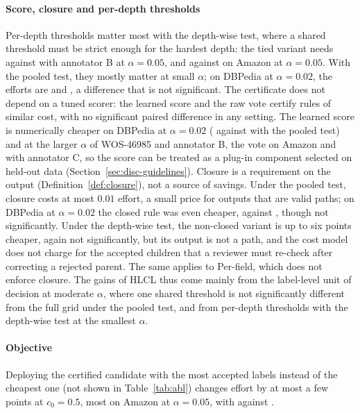 \documentclass[preprint,12pt]{elsarticle}
\theoremstyle{definition}
\newcommand{\hlcl}{\textup{\textsc{HLCL}}}
\begin{document}
\paragraph{Score, closure and per-depth thresholds}
Per-depth thresholds matter most with the depth-wise test, where a shared
threshold must be strict enough for the hardest depth: the tied variant needs
 against
 with annotator B at $\alpha=0.05$, and
 against
 on Amazon at $\alpha=0.05$. With the pooled
test, they mostly matter at small $\alpha$; on DBPedia at $\alpha=0.02$, the
efforts are  and
, a difference that is not significant.
The certificate does not depend on a tuned scorer: the learned score and the raw
vote certify rules of similar cost, with no significant paired difference in
any setting. The learned score is numerically cheaper on DBPedia at
$\alpha=0.02$ ( against
 with the pooled test) and at the
larger $\alpha$ of WOS-46985 and annotator B, the vote on Amazon and with
annotator C, so the score can be treated as a plug-in component selected on
held-out data (Section~\ref{sec:disc-guidelines}). Closure is a requirement on
the output (Definition~\ref{def:closure}), not a source of savings. Under the
pooled test, closure costs at most $0.01$ effort, a small price for outputs
that are valid paths; on DBPedia at $\alpha=0.02$ the closed rule was even
cheaper,  against
, though not significantly. Under the
depth-wise test, the non-closed variant is up to six points cheaper, again not
significantly, but its output is not a path, and the cost model does not charge
for the accepted children that a reviewer must re-check after correcting a
rejected parent. The same applies to Per-field, which does not enforce closure.
The gains of \hlcl{} thus come mainly from the label-level unit of decision at
moderate $\alpha$, where one shared threshold is not significantly different
from the full grid under the pooled test, and from per-depth thresholds with the
depth-wise test at the smallest $\alpha$.

\paragraph{Objective}
Deploying the certified candidate with the most accepted labels instead of the
cheapest one (not shown in Table~\ref{tab:abl}) changes effort by at most a few
points at $c_0=0.5$, most on Amazon at $\alpha=0.05$, with
 against .
\end{document}
